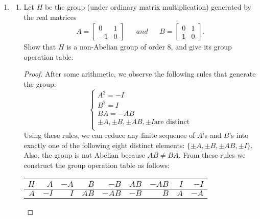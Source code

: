 \documentclass{article}
\begin{document}
\begin{enumerate}
  \item \label{part_4}
    \begin{enumerate}
      \item Let $H$ be the group (under ordinary matrix multiplication)
        generated by the real matrices \label{part_a}
        \begin{align*}
          A =
            \begin{bmatrix}
              0   & 1 \\
              -1  & 0
            \end{bmatrix}
            && and &&
          B =
            \begin{bmatrix}
              0   & 1 \\
              1   & 0
            \end{bmatrix}.
        \end{align*}
        Show that $H$ is a non-Abelian group of order 8, and give its group
        operation table.
        \begin{proof}
          After some arithmetic, we observe the following rules that generate
          the group:
          \begin{equation} \label{eqn:H}
            \begin{cases}
              A^2=-I \\
              B^2=I \\
              BA=-AB \\
              \pm A, \pm B, \pm AB, \pm I \text{are distinct} \\
            \end{cases}
          \end{equation}
          Using these rules, we can reduce any finite sequence of $A$'s and
          $B$'s into exactly one of the following eight distinct elements:
          $\{\pm A, \pm B, \pm AB, \pm I\}$. Also, the group is not Abelian
          because $AB\neq BA$. From these rules we construct the group
          operation table as follows: \\
          \begin{center}
            \begin{tabular}{|r||r|r|r|r|r|r|r|r|}
              \hline
              $H$       & $A$   & $-A$  & $B$   & $-B$  & $AB$  & $-AB$ & $I$   & $-I$ \\
              \hline\hline
              $A$       & $-I$  & $I$   & $AB$  & $-AB$ & $-B$  & $B$   & $A$   & $-A$ \\
              \hline

\end{tabular}
\end{center}
\end{proof}
\end{enumerate}
\end{enumerate}
\end{document}

